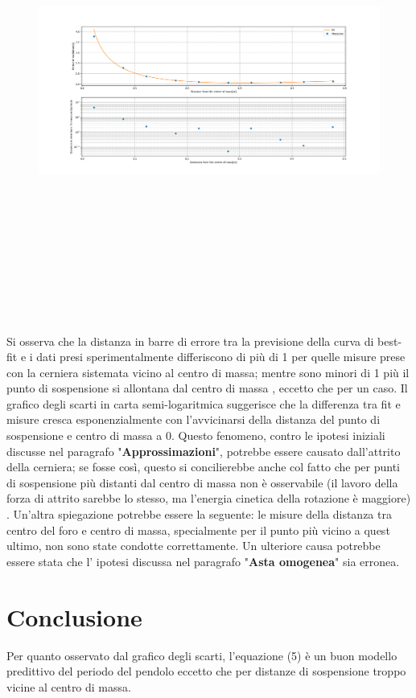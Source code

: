 \documentclass[11pt]{article}
\begin{document}
\begin{figure}[htbp]
\centerline{\includegraphics[width=20cm, height=15cm]{physicalpendulum_plots_1.0.png}}

\label{fig}
\end{figure}
Si osserva che la distanza in barre di errore tra la previsione della curva di best-fit e i dati presi sperimentalmente differiscono di più di 1 per quelle misure prese con la cerniera  sistemata vicino al centro di massa; mentre sono minori di 1 più il punto di sospensione si allontana dal centro di massa , eccetto che per un caso.
Il grafico degli scarti in carta semi-logaritmica suggerisce che la differenza tra fit e misure cresca esponenzialmente con l'avvicinarsi della distanza del punto di sospensione e centro di massa a 0.
Questo fenomeno, contro le ipotesi iniziali discusse nel paragrafo "\textbf{Approssimazioni}", potrebbe essere causato dall'attrito della cerniera; se fosse così, questo si concilierebbe anche col fatto che per punti di sospensione più distanti dal centro di massa non è osservabile (il lavoro della forza di attrito sarebbe lo stesso, ma l'energia cinetica della rotazione è maggiore)  . 
Un'altra spiegazione potrebbe essere la seguente: le misure della distanza tra centro del foro e centro di massa, specialmente per il punto più vicino a quest ultimo, non sono state condotte correttamente.
Un ulteriore causa potrebbe essere stata che l' ipotesi discussa nel paragrafo "\textbf{Asta omogenea}"  sia erronea.
\section{Conclusione}
Per quanto osservato dal grafico degli scarti, l'equazione (5) è un buon modello predittivo del periodo del pendolo eccetto che per distanze di sospensione troppo vicine al centro di massa.
\end{document}
